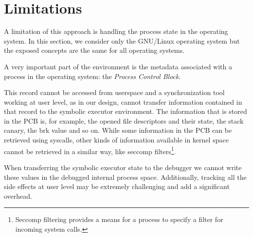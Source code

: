 



\section{Limitations}

A limitation of this approach is handling the process state in the operating system. In this section, we consider only the GNU/Linux operating system but the exposed concepts are the same for all operating systems.

A very important part of the environment is the metadata associated with a process in the operating system: the {\em Process Control Block}.

This record cannot be accessed from userspace and a synchronization tool working at user level, as in our design, cannot transfer information contained in that record to the symbolic executor environment. The information that is stored in the PCB is, for example, the opened file descriptors and their state, the stack canary, the brk value and so on. While some information in the PCB can be retrieved using syscalls, other kinds of information available in kernel space cannot be retrieved in a similar way, like seccomp filters\footnote{Seccomp filtering provides a means for a process to specify a filter for
incoming system calls.}.

When transferring the symbolic executor state to the debugger we cannot write these values in the debugged internal process space. Additionally, tracking all the side effects at user level may be extremely challenging and add a significant overhead.

